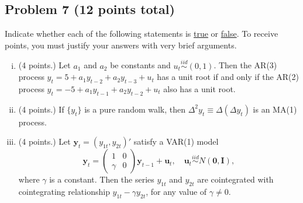 \documentclass[12pt]{article}
\begin{document}

\subsection*{Problem 7 (12 points total)}
Indicate whether each of the following statements is \underline{true} or \underline{false}. To receive points, you must justify your answers with very brief arguments.

\begin{enumerate}[i)]
\item (4 points.) Let $a_1$ and $a_2$ be constants and $u_t \overset{iid}{\sim} (0,1)$. Then the AR(3) process $y_t = 5 + a_1 y_{t-2} + a_2 y_{t-3} + u_t$ has a unit root if and only if the AR(2) process $y_t = -5 + a_1 y_{t-1} + a_2 y_{t-2} + u_t$ also has a unit root.
\item (4 points.) If $\lbrace y_t \rbrace$ is a pure random walk, then $\Delta^2 y_t \equiv \Delta(\Delta y_t)$ is an MA(1) process.
\item (4 points.) Let $\bm{y}_t = (y_{1t},y_{2t})'$ satisfy a VAR(1) model
\[\bm{y}_t = \begin{pmatrix}
1 & 0 \\
\gamma & 0
\end{pmatrix}\bm{y}_{t-1} + \bm{u}_t,\quad \bm{u}_t \overset{iid}{\sim} N(\bm{0},\bm{I}),\]
where $\gamma$ is a constant. Then the series $y_{1t}$ and $y_{2t}$ are cointegrated with cointegrating relationship $y_{1t}-\gamma y_{2t}$, for any value of $\gamma \neq 0$.
\end{enumerate}

\clearpage


\end{document}
